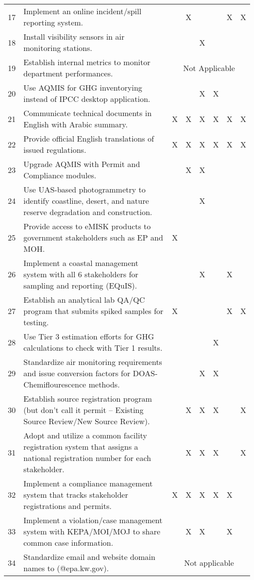 \begin{table}[H]
{\begin{tabular}{@{}clcccccc@{}}
17 & Implement an online incident/spill reporting system. &  & X &  &  & X & X \\
18 & Install visibility sensors in air monitoring stations. &  &  & X &  &  &  \\
19 & Establish internal metrics to monitor department performances. & \multicolumn{6}{c}{Not Applicable} \\
20 & Use AQMIS for GHG inventorying instead of IPCC desktop application. &  &  & X & X &  &  \\
21 & Communicate technical documents in English with Arabic summary. & X & X & X & X & X & X \\
22 & Provide official English translations of issued regulations. & X & X & X & X & X & X \\
23 & Upgrade AQMIS with Permit and Compliance modules. &  & X & X &  &  &  \\
24 & Use UAS-based photogrammetry to identify coastline, desert, and nature reserve degradation and construction. &  &  & X &  &  &  \\
25 & Provide access to eMISK products to government stakeholders such as EP and MOH. & X &  &  &  &  &  \\
26 & Implement a coastal management system with all 6 stakeholders for sampling and reporting (EQuIS). &  &  & X &  & X &  \\
27 & Establish an analytical lab QA/QC program that submits spiked samples for testing. & X &  &  &  & X & X \\
28 & Use Tier 3 estimation efforts for GHG calculations to check with Tier 1 results. &  &  &  & X &  &  \\
29 & Standardize air monitoring requirements and issue conversion factors for DOAS-Chemiflourescence methods. &  &  & X & X &  &  \\
30 & Establish source registration program (but don’t call it permit – Existing Source Review/New Source Review). &  & X & X & X &  & X \\
31 & Adopt and utilize a common facility registration system that assigns a national registration number for each stakeholder. &  & X & X & X &  & X \\
32 & Implement a compliance management system that tracks stakeholder registrations and permits. & X & X & X & X & X &  \\
33 & Implement a violation/case management system with KEPA/MOI/MOJ to share common case information. &  & X & X &  & X &  \\
34 & Standardize email and website domain names to (@epa.kw.gov). & \multicolumn{6}{c}{Not applicable} \\

\end{tabular}}
\end{table}
